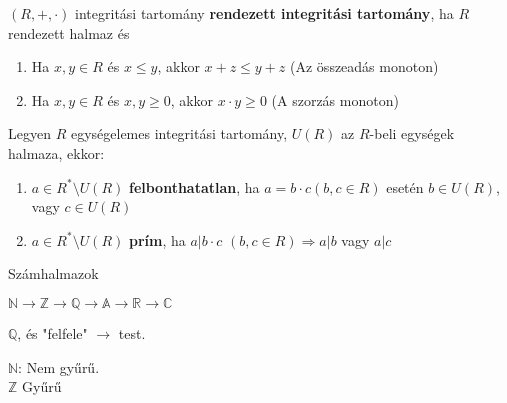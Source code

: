 \begin{frame}
  \begin{tcolorbox}[title={Def.: Rendezett Integritási Tartomány}]
    $(R, +, {\cdot})$ integritási tartomány \textbf{rendezett integritási tartomány}, ha $R$ rendezett halmaz és\\
    \begin{enumerate}
      \item Ha $x, y \in R$ és $x \leq y$, akkor $x + z \leq y + z$ (Az összeadás monoton)
      \item Ha $x, y \in R$ és $x, y \geq 0$, akkor $x \cdot y \geq 0$ (A szorzás monoton)
    \end{enumerate}
  \end{tcolorbox}

  \begin{tcolorbox}[title={Def.: Felbonthatatlan, Prím}]
    Legyen $R$ egységelemes integritási tartomány, $U(R)$ az $R$-beli egységek halmaza, ekkor:\\
    \begin{enumerate}
      \item $a \in R^* \setminus U(R)$ \textbf{felbonthatatlan}, ha $a = b \cdot c (b, c \in R)$ esetén $b \in U(R)$, vagy $c \in U(R)$
      \item $a \in R^* \setminus U(R)$ \textbf{prím}, ha $a | b \cdot c$ $(b, c \in R) \Rightarrow a|b$ vagy $a|c$
    \end{enumerate}
  \end{tcolorbox}
\end{frame}



\begin{frame}[plain]
\begin{tcolorbox}[center, colback={myyellow}, coltext={black}, colframe={myyellow}]
    {\Huge Számhalmazok}
    \mmedskip
\end{tcolorbox}
\end{frame}

\begin{frame}
  \begin{tcolorbox}
    $\mathbb{N} \rightarrow \mathbb{Z} \rightarrow \mathbb{Q} \rightarrow \mathbb{A} \rightarrow \mathbb{R} \rightarrow \mathbb{C}$\\
    \msmallskip
    
    $\mathbb{Q}$, és "felfele" $\rightarrow$ test.
    \mmedskip
    
    $\mathbb{N}$: Nem gyűrű.\\
    $\mathbb{Z}$ Gyűrű\\
  \end{tcolorbox}
\end{frame}


